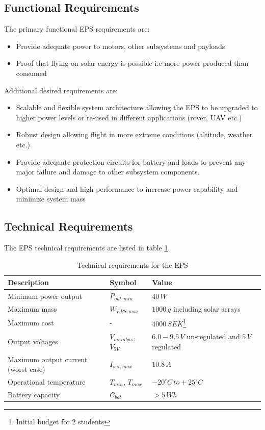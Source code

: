 \subsection{Functional Requirements}
The primary functional \ac{EPS} requirements are:
%
\begin{itemize}
\item Provide adequate power to motors, other subsystems and payloads
\item Proof that flying on solar energy is possible i.e more power produced than consumed
\end{itemize}
%
Additional desired requirements are:
%
\begin{itemize}
\item Scalable and flexible system architecture allowing the \ac{EPS} to be upgraded to higher power levels or re-used in different applications (rover, \ac{UAV} etc.)
\item Robust design allowing flight in more extreme conditions (altitude, weather etc.)
\item Provide adequate protection circuits for battery and loads to prevent any major failure and damage to other subsystem components.
\item Optimal design and high performance to increase power capability and minimize system mass
\end{itemize}
%
\subsection{Technical Requirements}
The \ac{EPS} technical requirements are listed in table \ref{tab:technical_requirements}.
%
\begin{table}[H]
\centering
\caption{Technical requirements for the \ac{EPS}}
\label{tab:technical_requirements}
\begin{minipage}{\textwidth}
\begin{tabular}{p{}p{}p{}}
\hline
\textbf{Description} & \textbf{Symbol} & \textbf{Value}\\
\hline
Minimum power output & $P_{out,min}$ & $40\,W$\\
Maximum mass & $W_{EPS,max}$ & $1000\,g$ including solar arrays\\
Maximum cost & - & $4000\,SEK$\footnote{Initial budget for 2 students}\\
Output voltages & $V_{mainbus}$, $V_{5V}$ & $6.0-9.5\,V$ un-regulated and $5\,V$ regulated\\
Maximum output current (worst case) & $I_{out,max}$ & $10.8\,A$\\
Operational temperature & $T_{min}$, $T_{max}$ & $-20^{\circ}C\,to +25^{\circ}C$\\
Battery capacity & $C_{bat}$ & $>5\,Wh$\\
\hline
\end{tabular}\par
\vspace{-0.75\skip\footins}
\renewcommand{\footnoterule}{}
\end{minipage}
\end{table}


